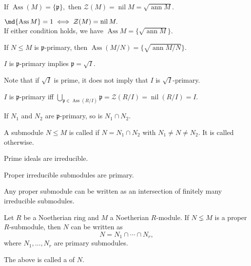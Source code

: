 \documentclass[12pt]{article}	%
\DeclareMathOperator{\Ass}{Ass}
\DeclareMathOperator{\ann}{ann}
\DeclareMathOperator{\nil}{nil}
\begin{document}
\begin{prop}
	If $\Ass(M) = \{\mathfrak{p}\},$ then $\mathcal{Z}(M) = \nil M = \sqrt{\ann M}.$
\end{prop}
\begin{thm}
	$\md{\Ass M} = 1 \iff \mathcal{Z}(M) = \nil M.$\\
	If either condition holds, we have $\Ass M = \{\sqrt{\ann M}\}.$
\end{thm}

\begin{cor}
	If $N \le M$ is $\mathfrak{p}$-primary, then $\Ass(M/N) = \{\sqrt{\ann M/N}\}.$
\end{cor}
\begin{cor}
	$I$ is $\mathfrak{p}$-primary implies $\mathfrak{p} = \sqrt{I}.$
\end{cor}
\begin{rem}
	Note that if $\sqrt{I}$ is prime, it does not imply that $I$ is $\sqrt{I}$-primary.
\end{rem}
\begin{cor}
	$I$ is $\mathfrak{p}$-primary iff $\bigcup_{\mathfrak{p} \in \Ass(R/I)}\mathfrak{p} = \mathcal{Z}(R/I) = \nil(R/I) = I.$
\end{cor}

\begin{prop}
	If $N_1$ and $N_2$ are $\mathfrak{p}$-primary, so is $N_1 \cap N_2.$
\end{prop}

\begin{defn}%
	A submodule $N \le M$ is called  if $N = N_1 \cap N_2$ with $N_1 \neq N \neq N_2.$ It is called  otherwise.
\end{defn}
\begin{prop}
	Prime ideals are irreducible.
\end{prop}

\begin{thm}
	Proper irreducible submodules are primary.
\end{thm}
\begin{thm}
	Any proper submodule can be written as an intersection of finitely many irreducible submodules.
\end{thm}

\begin{cor}
	Let $R$ be a Noetherian ring and $M$ a Noetherian $R$-module. If $N \lneq M$ is a proper $R$-submodule, then $N$ can be written as
	\begin{equation*} 
		N = N_1 \cap \cdots \cap N_r,
	\end{equation*}
	where $N_1, \ldots, N_r$ are primary submodules. 

	The above is called a  of $N.$
\end{cor}
\end{document}
